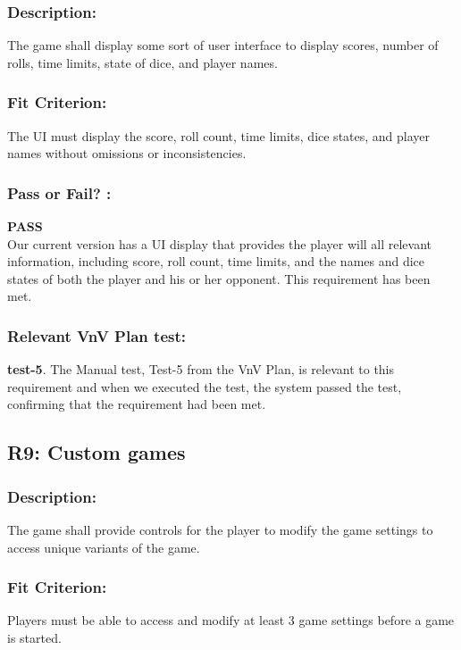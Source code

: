 \documentclass[12pt, titlepage]{article}
\begin{document}
\subsubsection*{Description:}  The game shall display some sort of user interface to display scores, number of rolls, time limits, state of dice, and player names.

\subsubsection*{Fit Criterion:} The UI must display the score, roll count, time limits, dice states, and player names without omissions or inconsistencies.

\subsubsection*{Pass or Fail? :} 

 \noindent \textbf{PASS}\\
 
 Our current version has a UI display that provides the player will all relevant information, including score, roll count, time limits, and the names and dice states of both the player and his or her opponent. This requirement has been met.

\subsubsection*{Relevant VnV Plan test: } \textbf{test-5}.  The Manual test, Test-5 from the VnV Plan, is relevant to this requirement and when we executed the test, the system passed the test, confirming that the requirement had been met.

 
\subsection{R9: Custom games} 
\label{R9}

\subsubsection*{Description:}The game shall provide controls for the player to modify the game settings to access unique variants of the game.

\subsubsection*{Fit Criterion:}Players must be able to access and modify at least 3 game settings before a game is started.
\end{document}
